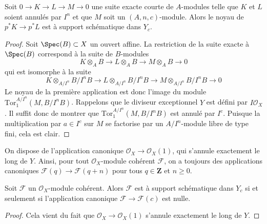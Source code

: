 \begin{lemma}
\label{lemma-almost-exactness}
Soit $0 \to K \to L \to M \to 0$ une suite exacte courte de $A$-modules telle que $K$ et $L$ soient annulés par $I^n$ et que $M$ soit un $(A, n, c)$-module. Alors le noyau de $p^*K \to p^*L$ est à support schématique dans $Y_c$.
\end{lemma}

\begin{proof}
Soit $\Spec(B) \subset X$ un ouvert affine. La restriction de la suite exacte à $\Spec(B)$ correspond à la suite de $B$-modules
$$
K \otimes_A B \to L \otimes_A B \to M \otimes_A B \to 0
$$
qui est isomorphe à la suite
$$
K \otimes_{A/I^n} B/I^nB \to
L \otimes_{A/I^n} B/I^nB \to
M \otimes_{A/I^n} B/I^nB \to 0
$$
Le noyau de la première application est donc l'image du module $\text{Tor}_1^{A/I^n}(M, B/I^nB)$. Rappelons que le diviseur exceptionnel $Y$ est défini par $I\mathcal{O}_X$. Il suffit donc de montrer que $\text{Tor}_1^{A/I^n}(M, B/I^nB)$ est annulé par $I^c$. Puisque la multiplication par $a \in I^c$ sur $M$ se factorise par un $A/I^n$-module libre de type fini, cela est clair.

\end{proof}

\noindent
On dispose de l'application canonique $\mathcal{O}_X \to \mathcal{O}_X(1)$, qui s'annule exactement le long de $Y$. Ainsi, pour tout $\mathcal{O}_X$-module cohérent $\mathcal{F}$, on a toujours des applications canoniques $\mathcal{F}(q) \to \mathcal{F}(q + n)$ pour tous $q \in \mathbf{Z}$ et $n \geq 0$.

\begin{lemma}
\label{lemma-annihilated}
Soit $\mathcal{F}$ un $\mathcal{O}_X$-module cohérent. Alors $\mathcal{F}$ est à support schématique dans $Y_c$ si et seulement si l'application canonique $\mathcal{F} \to \mathcal{F}(c)$ est nulle.
\end{lemma}

\begin{proof}
Cela vient du fait que $\mathcal{O}_X \to \mathcal{O}_X(1)$ s'annule exactement le long de $Y$.
\end{proof}

